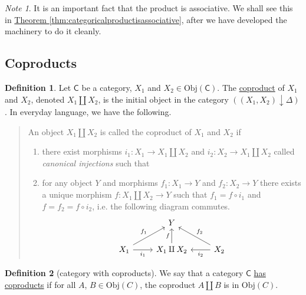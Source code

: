 \documentclass[a4paper]{report}
\newcommand{\defn}[1]{\ul{#1}}
\newcommand{\Obj}{\mathrm{Obj}}
\theoremstyle{definition}
\newtheorem{definition}{Definition}[section]
\theoremstyle{plain}
\theoremstyle{remark}
\newtheorem{note}{Note}[section]
\begin{document}
\begin{note}
  It is an important fact that the product is associative. We shall see this in \hyperref[thm:categoricalproductisassociative]{Theorem \ref*{thm:categoricalproductisassociative}}, after we have developed the machinery to do it cleanly.
\end{note}

\subsection{Coproducts}
\begin{definition}
  Let $\mathsf{C}$ be a category, $X_{1}$ and $X_{2} \in \Obj(\mathsf{C})$. The \defn{coproduct} of $X_{1}$ and $X_{2}$, denoted $X_{1} \amalg X_{2}$, is the initial object in the category $((X_{1},X_{2})\downarrow \Delta)$. In everyday language, we have the following.
  \begin{quote}
    An object $X_{1} \amalg X_{2}$ is called the coproduct of $X_{1}$ and $X_{2}$ if 
    \begin{enumerate}
      \item there exist morphisms $i_{1}\colon X_{1} \to X_{1} \amalg X_{2}$ and $i_{2}\colon X_{2} \to X_{1} \amalg X_{2}$ called \emph{canonical injections} such that

      \item for any object $Y$ and morphisms $f_{1}\colon X_{1} \to Y$ and $f_{2}\colon X_{2} \to Y$ there exists a unique morphism $f\colon X_{1} \amalg X_{2} \to Y$ such that $f_{1} = f \circ i_{1}$ and $f = f_{2} = f \circ i_{2}$, i.e. the following diagram commutes.
        \begin{equation*}
          \begin{tikzcd}
            & Y & \\
            X_{1} \arrow[ur, "f_{1}"] \arrow[r, swap, "i_{1}"] & X_{1} \arrow[u, "f"] \amalg X_{2} & X_{2} \arrow[l, "i_{2}"] \arrow[ul, swap, "f_{2}"]
          \end{tikzcd}
        \end{equation*}
    \end{enumerate}
  \end{quote}
\end{definition}

\begin{definition}[category with coproducts]
  \label{def:categorywithcoproducts}
  We say that a category $\mathsf{C}$ \defn{has coproducts} if for all $A$, $B \in \Obj(C)$, the coproduct $A \amalg B$ is in $\Obj(C)$.
\end{definition} 
\end{document}
